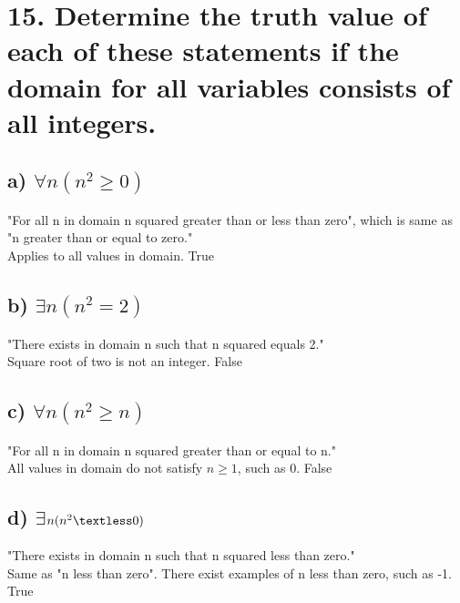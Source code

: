 \documentclass[11pt, oneside]{article} %
\numberwithin{equation}{section} %
\numberwithin{figure}{section} %
\numberwithin{table}{section} %
\begin{document}
\begin{table}[!htp]
\section{15. Determine the truth value of each of these statements if the domain for all variables consists of all integers.}
\subsection{a) $\forall$$n(n^2 \geq 0)$}
"For all n in domain n squared greater than or less than zero", which is same as "n greater than or equal to zero." \\
Applies to all values in domain. True
\subsection{b) $\exists$$n(n^2 = 2)$}
"There exists in domain n such that n squared equals 2."\\
Square root of two is not an integer. False
\subsection{c) $\forall$$n(n^2 \geq n)$}
"For all n in domain n squared greater than or equal to n." \\
All values in domain do not satisfy $n \geq 1$, such as 0. False
\subsection{d) $\exists$$n(n^2 \textless 0)$}
"There exists in domain n such that n squared less than zero."\\
Same as "n less than zero". There exist examples of n less than zero, such as -1. True
\end{table}
\end{document}
